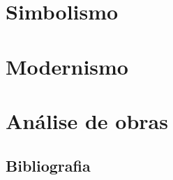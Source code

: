 \documentclass[12pt,fleqn]{book}
\begin{document}
\part{Simbolismo}





\part{Modernismo}





\part{Análise de obras}





\chapter*{Bibliografia}
\end{document}
